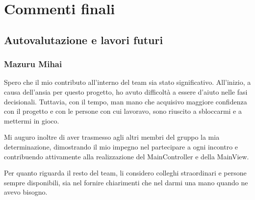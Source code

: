 \documentclass[a4paper,12pt]{report}
\begin{document}
\chapter{Commenti finali}

\section{Autovalutazione e lavori futuri}

\subsection{Mazuru Mihai}
Spero che il mio contributo all'interno del team sia stato significativo. All'inizio, a causa dell'ansia per questo progetto, ho avuto difficoltà a essere d'aiuto nelle fasi decisionali. Tuttavia, con il tempo, man mano che acquisivo maggiore confidenza con il progetto e con le persone con cui lavoravo, sono riuscito a sbloccarmi e a mettermi in gioco.

Mi auguro inoltre di aver trasmesso agli altri membri del gruppo la mia determinazione, dimostrando il mio impegno nel partecipare a ogni incontro e contribuendo attivamente alla realizzazione del MainController e della MainView.

Per quanto riguarda il resto del team, li considero colleghi straordinari e persone sempre disponibili, sia nel fornire chiarimenti che nel darmi una mano quando ne avevo bisogno.
\end{document}
